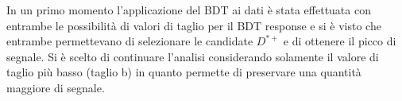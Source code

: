 In un primo momento l'applicazione del BDT ai dati è stata effettuata con entrambe le possibilità di valori di taglio per il BDT response e si è visto che entrambe permettevano di selezionare le candidate $D^{*+}$ e di ottenere il picco di segnale. Si \`e scelto di continuare l'analisi considerando solamente il valore di taglio più basso (taglio b) in quanto permette di preservare una quantit\`a maggiore di segnale.  


  
  

